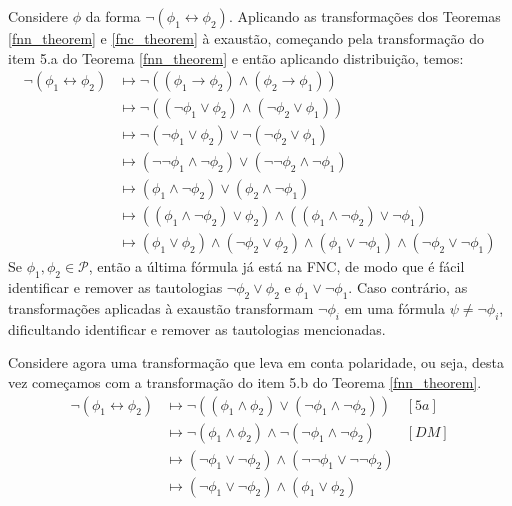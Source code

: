 \begin{example}
	\label{exemplo_fnn_fnc}
    Considere $\phi$ da forma $\neg(\phi_1 \leftrightarrow \phi_2)$. Aplicando as transformações dos Teoremas \ref{fnn_theorem} e \ref{fnc_theorem} à exaustão, começando pela transformação do item 5.a do Teorema \ref{fnn_theorem} e então aplicando distribuição, temos:
    \begin{equation*}
        \begin{split}
            \neg(\phi_1 \leftrightarrow \phi_2) & \longmapsto \neg((\phi_1 \rightarrow \phi_2) \wedge (\phi_2 \rightarrow \phi_1)) \\
                 & \longmapsto \neg((\neg \phi_1 \vee \phi_2) \wedge (\neg \phi_2 \vee \phi_1)) \\
                 & \longmapsto \neg(\neg \phi_1 \vee \phi_2) \vee \neg(\neg \phi_2 \vee \phi_1) \\
                 & \longmapsto (\neg \neg \phi_1 \wedge \neg \phi_2) \vee (\neg \neg \phi_2 \wedge \neg \phi_1) \\
                 & \longmapsto (\phi_1 \wedge \neg \phi_2) \vee (\phi_2 \wedge \neg \phi_1) \\
                 & \longmapsto ((\phi_1 \wedge \neg \phi_2) \vee \phi_2) \wedge ((\phi_1 \wedge \neg \phi_2) \vee \neg \phi_1) \\
                 & \longmapsto (\phi_1 \vee \phi_2) \wedge (\neg \phi_2 \vee \phi_2) \wedge (\phi_1 \vee \neg \phi_1) \wedge (\neg \phi_2 \vee \neg \phi_1)
        \end{split}
    \end{equation*}
    Se $\phi_1,\phi_2 \in \mathcal{P}$, então a última fórmula já está na FNC, de modo que é fácil identificar e remover as tautologias $\neg \phi_2 \vee \phi_2$ e $\phi_1 \vee \neg \phi_1$. Caso contrário, as transformações aplicadas à exaustão transformam $\neg \phi_i$ em uma fórmula $\psi \neq \neg \phi_i$, dificultando identificar e remover as tautologias mencionadas.
    
    Considere agora uma transformação que leva em conta polaridade, ou seja, desta vez começamos com a transformação do item 5.b do Teorema \ref{fnn_theorem}.
    \[
    \begin{array}{lll}
            \neg(\phi_1 \leftrightarrow \phi_2) & \longmapsto \neg((\phi_1 \wedge \phi_2) \vee (\neg \phi_1 \wedge \neg \phi_2)) & [5a]\\
                 & \longmapsto \neg(\phi_1 \wedge \phi_2) \wedge \neg(\neg \phi_1 \wedge \neg \phi_2) & [DM]\\
                 & \longmapsto (\neg \phi_1 \vee \neg \phi_2) \wedge (\neg \neg \phi_1 \vee \neg \neg \phi_2) \\
                 & \longmapsto (\neg \phi_1 \vee \neg \phi_2) \wedge (\phi_1 \vee \phi_2) \\
    \end{array}
    \]
    

\end{example}
